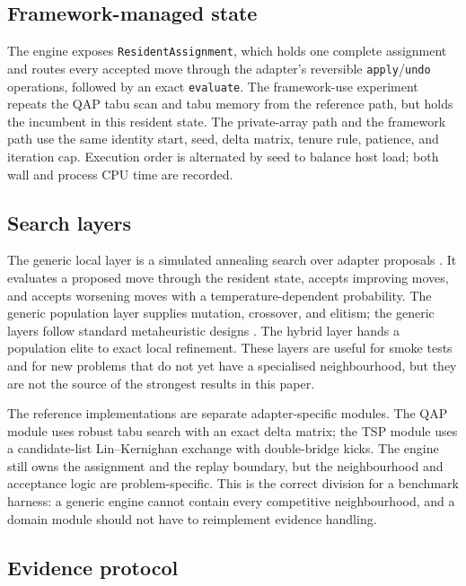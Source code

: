 \documentclass[pdflatex,sn-mathphys-num]{sn-jnl}
\begin{document}
\subsection{Framework-managed state}

The engine exposes \texttt{ResidentAssignment}, which holds one complete assignment and routes every
accepted move through the adapter's reversible \texttt{apply}/\texttt{undo} operations, followed by
an exact \texttt{evaluate}. The framework-use experiment repeats the QAP tabu scan and tabu memory
from the reference path, but holds the incumbent in this resident state. The private-array path and
the framework path use the same identity start, seed, delta matrix, tenure rule, patience, and
iteration cap. Execution order is alternated by seed to balance host load; both wall and process CPU
time are recorded.

\subsection{Search layers}

The generic local layer is a simulated annealing search over adapter proposals \citep{kirkpatrick1983}. It evaluates a
proposed move through the resident state, accepts improving moves, and accepts worsening moves with a
temperature-dependent probability. The generic population layer supplies mutation, crossover, and
elitism; the generic layers follow standard metaheuristic designs \citep{talbi2009,pisinger2010}. The
hybrid layer hands a population elite to exact local refinement. These layers are useful
for smoke tests and for new problems that do not yet have a specialised neighbourhood, but they are
not the source of the strongest results in this paper.

The reference implementations are separate adapter-specific modules. The QAP module uses robust tabu
search with an exact delta matrix; the TSP module uses a candidate-list Lin--Kernighan exchange with
double-bridge kicks. The engine still owns the assignment and the replay boundary, but the
neighbourhood and acceptance logic are problem-specific. This is the correct division for a benchmark
harness: a generic engine cannot contain every competitive neighbourhood, and a domain module should
not have to reimplement evidence handling.

\subsection{Evidence protocol}
\end{document}
